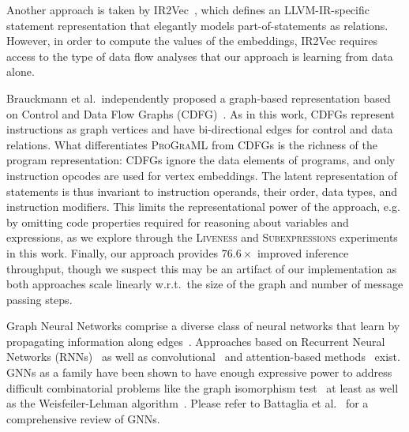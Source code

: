 Another approach is taken by IR2Vec~\cite{KeerthyS2019}, which defines
an LLVM-IR-specific statement representation that elegantly models
part-of-statements as relations. However, in order to compute the
values of the embeddings, IR2Vec requires access to the type of data
flow analyses that our approach is learning from data alone.

Brauckmann et al.~independently proposed a graph-based representation
based on Control and Data Flow Graphs (CDFG)~\cite{Brauckmann2020}. As
in this work, CDFGs represent instructions as graph vertices and have
bi-directional edges for control and data relations. What
differentiates \textsc{ProGraML} from CDFGs is the richness of the
program representation: CDFGs ignore the data elements of programs,
and only instruction opcodes are used for vertex embeddings. The
latent representation of statements is thus invariant to instruction
operands, their order, data types, and instruction modifiers. This
limits the representational power of the approach, e.g. by omitting
code properties required for reasoning about variables and
expressions, as we explore through the \textsc{Liveness} and
\textsc{Subexpressions} experiments in this work. Finally, our
approach provides $76.6\times$ improved inference throughput, though
we suspect this may be an artifact of our implementation as both
approaches scale linearly w.r.t.\ the size of the graph and number of
message passing steps.

Graph Neural Networks comprise a diverse class of neural networks that
learn by propagating information along
edges~\cite{Gori2005a,Scarselli2009,Battaglia2018}. Approaches based
on Recurrent Neural Networks (RNNs)~\cite{Li2015a,Gilmer2017} as well
as convolutional~\cite{Defferrard2016,Kipf2017} and attention-based
methods~\cite{Velickovic2018,Wang2019a} exist. GNNs as a family have
been shown to have enough expressive power to address difficult
combinatorial problems like the graph isomorphism test~\cite{Xu2019}
at least as well as the Weisfeiler-Lehman
algorithm~\cite{Weisfeiler1968}. Please refer to Battaglia et
al.~\cite{Battaglia2018} for a comprehensive review of GNNs.
